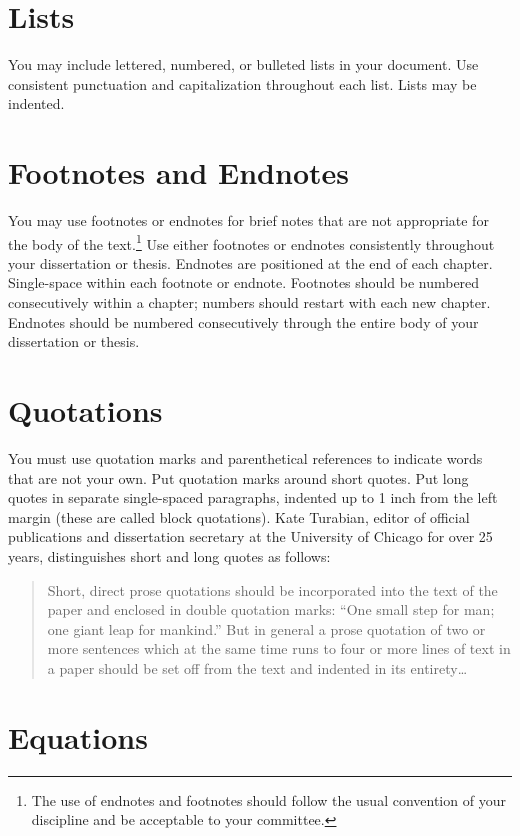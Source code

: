 \section{Lists}

You may include lettered, numbered, or bulleted lists in your document.
Use consistent punctuation and capitalization throughout each list.
Lists may be indented.

\section{Footnotes and Endnotes}

You may use footnotes or endnotes for brief notes that are not appropriate for the body of the text.\footnote{The use of endnotes and footnotes should follow the usual convention of your discipline and be acceptable to your committee.}
Use either footnotes or endnotes consistently throughout your dissertation or thesis.
Endnotes are positioned at the end of each chapter.
Single-space within each footnote or endnote.
Footnotes should be numbered consecutively within a chapter; numbers should restart with each new chapter.
Endnotes should be numbered consecutively through the entire body of your dissertation or thesis.

\section{Quotations}

You must use quotation marks and parenthetical references to indicate words that are not your own.
Put quotation marks around short quotes.
Put long quotes in separate single-spaced paragraphs, indented up to 1 inch from the left margin (these are called block quotations).
Kate Turabian, editor of official publications and dissertation secretary at the University of Chicago for over 25 years, distinguishes short and long quotes as follows:

\begin{quote}
    Short, direct prose quotations should be incorporated into the text of the paper and enclosed in
    double quotation marks: ``One small step for man; one giant leap for mankind.'' But in general a
    prose quotation of two or more sentences which at the same time runs to four or more lines of
    text in a paper should be set off from the text and indented in its
    entirety\ldots~\cite{Turabian}
\end{quote}

\section{Equations}

